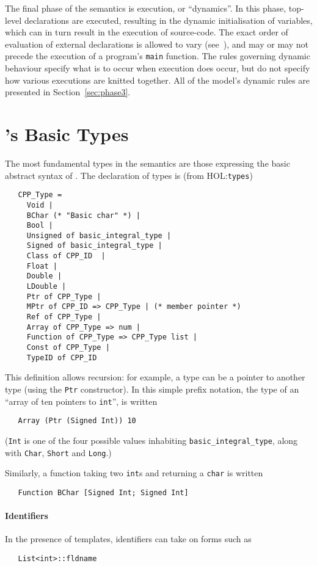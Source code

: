 \documentclass[11pt]{article}
\newcommand{\HOLfile}[1]{HOL:\texttt{#1}}
\begin{document}
The final phase of the semantics is execution, or ``dynamics''.  In
this phase, top-level declarations are executed, resulting in the
dynamic initialisation of variables, which can in turn result in the
execution of source-code.  The exact order of evaluation of external
declarations is allowed to vary
(see~\cite[\S3.6.2]{cpp-standard-iso14882}), and may or may not
precede the execution of a program's \texttt{main} function.  The
rules governing dynamic behaviour specify what is to occur when
execution does occur, but do not specify how various executions are
knitted together.  All of the model's dynamic rules are presented in
Section~\ref{sec:phase3}.

\section{\cpp's Basic Types}
\label{sec:basic-types}

The most fundamental types in the semantics are those expressing the
basic abstract syntax of \cpp{}.  The declaration of \cpp{} types is
(from \HOLfile{types})
\begin{verbatim}
   CPP_Type =
     Void |
     BChar (* "Basic char" *) |
     Bool |
     Unsigned of basic_integral_type |
     Signed of basic_integral_type |
     Class of CPP_ID  |
     Float |
     Double |
     LDouble |
     Ptr of CPP_Type |
     MPtr of CPP_ID => CPP_Type | (* member pointer *)
     Ref of CPP_Type |
     Array of CPP_Type => num |
     Function of CPP_Type => CPP_Type list |
     Const of CPP_Type |
     TypeID of CPP_ID
\end{verbatim}
This definition allows recursion: for example, a \cpp{} type can be a
pointer to another \cpp{} type (using the \texttt{Ptr}
constructor).  In this simple prefix notation, the type of an
``array of ten pointers to \texttt{int}'', is written
\begin{verbatim}
   Array (Ptr (Signed Int)) 10
\end{verbatim}
(\texttt{Int} is one of the four possible values inhabiting
\texttt{basic_integral_type}, along with \texttt{Char}, \texttt{Short}
and \texttt{Long}.)

Similarly, a function taking two \texttt{int}s and returning a
\texttt{char} is written
\begin{verbatim}
   Function BChar [Signed Int; Signed Int]
\end{verbatim}

\paragraph{Identifiers}
In the presence of templates, identifiers can take on forms such as
\begin{verbatim}
   List<int>::fldname
\end{verbatim}
\end{document}
